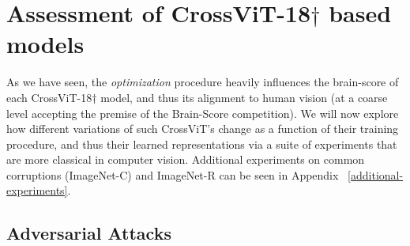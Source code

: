 \documentclass{article} %
\begin{document}
\vspace{-5pt}
\section{Assessment of CrossViT-18$\dagger$ based models}
As we have seen, the \textit{optimization} procedure heavily influences the brain-score of each CrossViT-18$\dagger$ model, and thus its alignment to human vision (at a coarse level accepting the premise of the Brain-Score competition). We will now explore how different variations of such CrossViT's change as a function of their training procedure, and thus their learned representations via a suite of  experiments that are more classical in computer vision. Additional experiments on common corruptions (ImageNet-C) and ImageNet-R can be seen in Appendix ~\ref{additional-experiments}.

\vspace{-5pt}
\subsection{Adversarial Attacks}

\end{document}
